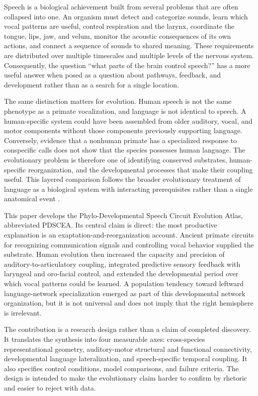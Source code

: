 \documentclass[conference]{IEEEtran}
\newcommand{\PDSCEA}{PDSCEA}
\begin{document}
Speech is a biological achievement built from several problems that are often collapsed into one. An organism must detect and categorize sounds, learn which vocal patterns are useful, control respiration and the larynx, coordinate the tongue, lips, jaw, and velum, monitor the acoustic consequences of its own actions, and connect a sequence of sounds to shared meaning. These requirements are distributed over multiple timescales and multiple levels of the nervous system. Consequently, the question ``what parts of the brain control speech?'' has a more useful answer when posed as a question about pathways, feedback, and development rather than as a search for a single location.

The same distinction matters for evolution. Human speech is not the same phenotype as a primate vocalization, and language is not identical to speech. A human-specific system could have been assembled from older auditory, vocal, and motor components without those components previously supporting language. Conversely, evidence that a nonhuman primate has a specialized response to conspecific calls does not show that the species possesses human language. The evolutionary problem is therefore one of identifying conserved substrates, human-specific reorganization, and the developmental processes that make their coupling useful. This layered comparison follows the broader evolutionary treatment of language as a biological system with interacting prerequisites rather than a single anatomical event \cite{fitch2010}.

This paper develops the Phylo-Developmental Speech Circuit Evolution Atlas, abbreviated \PDSCEA. Its central claim is direct: the most productive explanation is an exaptation-and-reorganization account. Ancient primate circuits for recognizing communication signals and controlling vocal behavior supplied the substrate. Human evolution then increased the capacity and precision of auditory-to-articulatory coupling, integrated predictive sensory feedback with laryngeal and oro-facial control, and extended the developmental period over which vocal patterns could be learned. A population tendency toward leftward language-network specialization emerged as part of this developmental network organization, but it is not universal and does not imply that the right hemisphere is irrelevant.

The contribution is a research design rather than a claim of completed discovery. It translates the synthesis into four measurable axes: cross-species representational geometry, auditory-motor structural and functional connectivity, developmental language lateralization, and speech-specific temporal coupling. It also specifies control conditions, model comparisons, and failure criteria. The design is intended to make the evolutionary claim harder to confirm by rhetoric and easier to reject with data.
\end{document}
